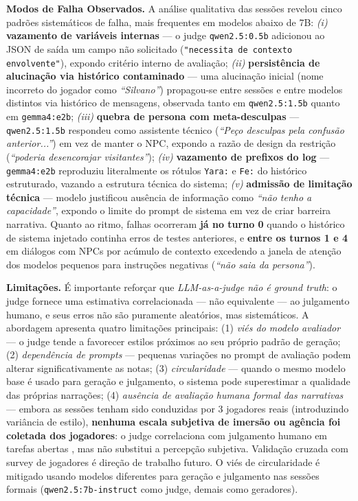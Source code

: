 \documentclass[12pt]{article}
\begin{document}
\textbf{Modos de Falha Observados.} A análise qualitativa das sessões revelou cinco padrões sistemáticos de falha, mais frequentes em modelos abaixo de 7B: \textit{(i)} \textbf{vazamento de variáveis internas} --- o judge \texttt{qwen2.5:0.5b} adicionou ao JSON de saída um campo não solicitado (\texttt{"necessita de contexto envolvente"}), expondo critério interno de avaliação; \textit{(ii)} \textbf{persistência de alucinação via histórico contaminado} --- uma alucinação inicial (nome incorreto do jogador como \textit{``Silvano''}) propagou-se entre sessões e entre modelos distintos via histórico de mensagens, observada tanto em \texttt{qwen2.5:1.5b} quanto em \texttt{gemma4:e2b}; \textit{(iii)} \textbf{quebra de persona com meta-desculpas} --- \texttt{qwen2.5:1.5b} respondeu como assistente técnico (\textit{``Peço desculpas pela confusão anterior...''}) em vez de manter o NPC, expondo a razão de design da restrição (\textit{``poderia desencorajar visitantes''}); \textit{(iv)} \textbf{vazamento de prefixos do log} --- \texttt{gemma4:e2b} reproduziu literalmente os rótulos \texttt{Yara:} e \texttt{Fe:} do histórico estruturado, vazando a estrutura técnica do sistema; \textit{(v)} \textbf{admissão de limitação técnica} --- modelo justificou ausência de informação como \textit{``não tenho a capacidade''}, expondo o limite do prompt de sistema em vez de criar barreira narrativa. Quanto ao ritmo, falhas ocorreram \textbf{já no turno 0} quando o histórico de sistema injetado continha erros de testes anteriores, e \textbf{entre os turnos 1 e 4} em diálogos com NPCs por acúmulo de contexto excedendo a janela de atenção dos modelos pequenos para instruções negativas (\textit{``não saia da persona''}).

\textbf{Limitações.} É importante reforçar que \textit{LLM-as-a-judge não é \textit{ground truth}}: o judge fornece uma estimativa correlacionada --- não equivalente --- ao julgamento humano, e seus erros não são puramente aleatórios, mas sistemáticos. A abordagem apresenta quatro limitações principais: (1) \textit{viés do modelo avaliador} --- o judge tende a favorecer estilos próximos ao seu próprio padrão de geração; (2) \textit{dependência de prompts} --- pequenas variações no prompt de avaliação podem alterar significativamente as notas; (3) \textit{circularidade} --- quando o mesmo modelo base é usado para geração e julgamento, o sistema pode superestimar a qualidade das próprias narrações; (4) \textit{ausência de avaliação humana formal das narrativas} --- embora as sessões tenham sido conduzidas por 3 jogadores reais (introduzindo variância de estilo), \textbf{nenhuma escala subjetiva de imersão ou agência foi coletada dos jogadores}: o judge correlaciona com julgamento humano em tarefas abertas \cite{zheng:2023}, mas não substitui a percepção subjetiva. Validação cruzada com survey de jogadores é direção de trabalho futuro. O viés de circularidade é mitigado usando modelos diferentes para geração e julgamento nas sessões formais (\texttt{qwen2.5:7b-instruct} como judge, demais como geradores).
\end{document}
